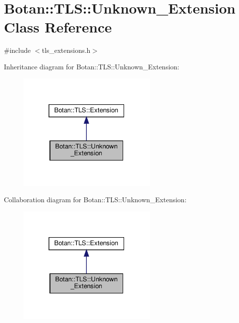 \hypertarget{class_botan_1_1_t_l_s_1_1_unknown___extension}{}\section{Botan\+:\+:T\+LS\+:\+:Unknown\+\_\+\+Extension Class Reference}
\label{class_botan_1_1_t_l_s_1_1_unknown___extension}


{\ttfamily \#include $<$tls\+\_\+extensions.\+h$>$}



Inheritance diagram for Botan\+:\+:T\+LS\+:\+:Unknown\+\_\+\+Extension\+:
\nopagebreak
\begin{figure}[H]
\begin{center}
\leavevmode
\includegraphics[width=196pt]{class_botan_1_1_t_l_s_1_1_unknown___extension__inherit__graph}
\end{center}
\end{figure}


Collaboration diagram for Botan\+:\+:T\+LS\+:\+:Unknown\+\_\+\+Extension\+:
\nopagebreak
\begin{figure}[H]
\begin{center}
\leavevmode
\includegraphics[width=196pt]{class_botan_1_1_t_l_s_1_1_unknown___extension__coll__graph}
\end{center}
\end{figure}
